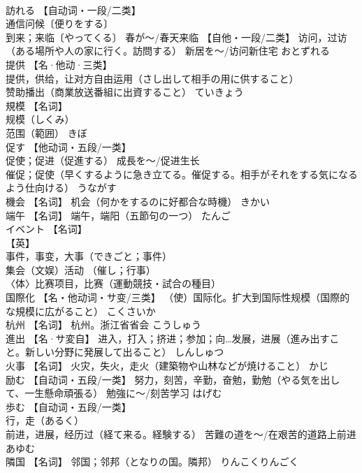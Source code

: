 \documentclass[8pt]{extreport}
\begin{document}
\begin{CJK}{UTF8}{min}
\\	訪れる	【自动词・一段/二类】 
\\	通信问候〔便りをする〕 
\\	到来；来临〔やってくる〕 春が～/春天来临 【自他・一段/二类】 访问，过访（ある場所や人の家に行く。訪問する） 新居を～/访问新住宅	おとずれる	
\\	提供	【名·他动·三类】 
\\	提供，供给，让对方自由运用（さし出して相手の用に供すること） 
\\	赞助播出（商業放送番組に出資すること）	ていきょう	
\\	規模	【名词】 
\\	规模（しくみ） 
\\	范围（範囲）	きぼ	
\\	促す	【他动词・五段/一类】 
\\	促使；促进（促進する） 成長を～/促进生长 
\\	催促；促使（早くするように急き立てる。催促する。相手がそれをする気になるよう仕向ける）	うながす	
\\	機会	【名词】 机会（何かをするのに好都合な時機）	きかい	
\\	端午	【名词】 端午，端阳（五節句の一つ）	たんご	
\\	イベント	【名词】 
\\	【英】
\\	事件，事变，大事（できごと；事件） 
\\	集会（文娱）活动 （催し；行事） 
\\	〈体〉比赛项目，比赛（運動競技・試合の種目）		
\\	国際化	【名・他动词・サ变/三类】 （使）国际化。扩大到国际性规模（国際的な規模に広がること）	こくさいか	
\\	杭州	【名词】 杭州。浙江省省会	こうしゅう	
\\	進出	【名·サ変自】 进入，打入；挤进；参加；向…发展，进展（進み出すこと。新しい分野に発展して出ること）	しんしゅつ	
\\	火事	【名词】 火灾，失火，走火（建築物や山林などが焼けること）	かじ	
\\	励む	【自动词・五段/一类】 努力，刻苦，辛勤，奋勉，勤勉（やる気を出して、一生懸命頑張る） 勉強に～/刻苦学习	はげむ	
\\	歩む	【自动词・五段/一类】 
\\	行，走（あるく） 
\\	前进，进展，经历过（経て来る。経験する） 苦難の道を～/在艰苦的道路上前进	あゆむ	
\\	隣国	【名词】 邻国；邻邦（となりの国。隣邦）	りんこくりんごく	

\end{CJK}
\end{document}
